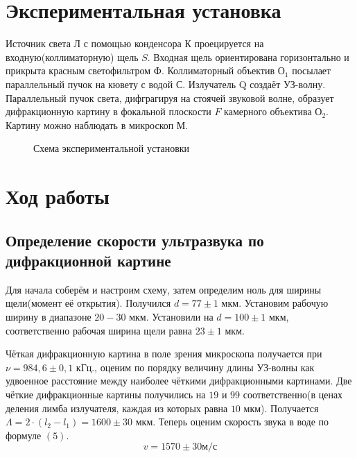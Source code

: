 \documentclass[a4paper,12pt]{article}
\begin{document}
\section{Экспериментальная установка}
Источник света Л с помощью конденсора К проецируется на входную(коллиматорную) щель $S$. Входная щель ориентирована горизонтально и прикрыта красным светофильтром Ф. Коллиматорный объектив $\text{О}_1$ посылает параллельный пучок на кювету с водой $С$. Излучатель Q создаёт УЗ-волну. Параллельный пучок света, дифграгируя на стоячей звуковой волне, образует дифракционную картину в фокальной плоскости $F$ камерного объектива $\text{О}_{2}$. Картину можно наблюдать в микроскоп М.
\begin{figure}[H]
  \caption{Схема экспериментальной установки}
	\label{fig:image1}
\end{figure}
\section{Ход работы}
\subsection*{Определение скорости ультразвука по дифракционной картине}
Для начала соберём и настроим схему, затем определим ноль для ширины щели(момент её открытия). Получился $d = 77 \pm 1$ мкм. Установим рабочую ширину в диапазоне $20-30$ мкм. Установили на $d = 100 \pm 1$ мкм, соответственно рабочая ширина щели равна $23 \pm 1$ мкм.

Чёткая дифракционную картина в поле зрения микроскопа получается при $\nu = 984,6 \pm 0,1$ кГц., оценим по порядку величину  длины УЗ-волны как удвоенное расстояние между наиболее чёткими дифракционными картинами. Две чёткие дифракционные картины получились на $19$ и $99$ соответственно(в ценах деления лимба излучателя, каждая из которых равна $10$ мкм). Получается $\Lambda = 2 \cdot (l_2 - l_1) = 1600 \pm 30$ мкм. Теперь оценим скорость звука в воде по формуле $(5)$. 
\[v = 1570 \pm 30 \text{м/с}\]
\\
\end{document}
